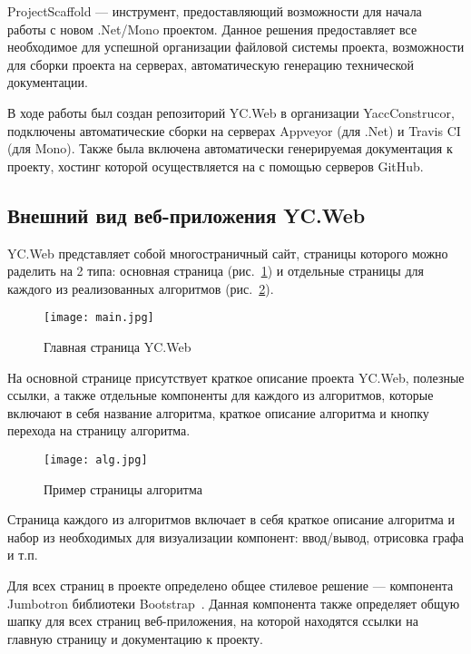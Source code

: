 \documentclass[14pt]{matmex-diploma-custom}
\begin{document}
ProjectScaffold --- инструмент, предоставляющий возможности для начала работы с новом .Net/Mono проектом. Данное решения предоставляет все необходимое для успешной организации файловой системы проекта, возможности для сборки проекта на серверах, автоматическую генерацию технической документации.

В ходе работы был создан репозиторий YC.Web в организации \linebreak YaccConstrucor, подключены автоматические сборки на серверах \linebreak Appveyor (для .Net) и Travis CI (для Mono). Также была включена автоматически генерируемая документация к проекту, хостинг которой осуществляется на с помощью серверов GitHub.

\subsection{Внешний вид веб-приложения YC.Web}

YC.Web представляет собой многостраничный сайт, страницы которого можно раделить на 2 типа: основная страница (рис.~\ref{pic1}) и отдельные страницы для каждого из реализованных алгоритмов (рис.~\ref{pic2}).

\begin{figure}[ht]
\centering
\texttt{[image: main.jpg]}
\caption{Главная страница YC.Web}
\label{pic1}
\end{figure}


На основной странице присутствует краткое описание проекта \linebreak YC.Web, полезные ссылки, а также отдельные компоненты для каждого из алгоритмов, которые включают в себя название алгоритма, краткое описание алгоритма и кнопку перехода на страницу алгоритма.

\begin{figure}[ht]
\centering
\texttt{[image: alg.jpg]}
\caption{Пример страницы алгоритма}
\label{pic2}
\end{figure}


Страница каждого из алгоритмов включает в себя краткое описание алгоритма и набор из необходимых для визуализации компонент: ввод/вывод, отрисовка графа и т.п.	

Для всех страниц в проекте определено общее стилевое решение --- компонента Jumbotron библиотеки Bootstrap~\cite{bootstrap}. Данная компонента также определяет общую шапку для всех страниц веб-приложения, на которой находятся ссылки на главную страницу и документацию к проекту.
\end{document}
